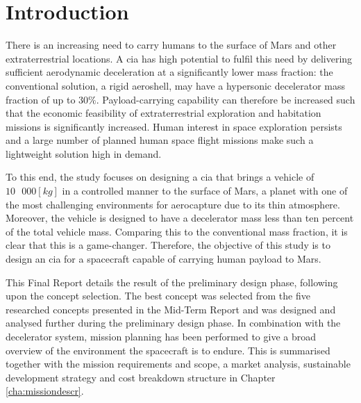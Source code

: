 \section{Introduction}
\label{cha:introduction}
There is an increasing need to carry humans to the surface of Mars and other extraterrestrial locations. A \gls{cia} has high potential to fulfil this need by delivering sufficient aerodynamic deceleration at a significantly lower mass fraction: the conventional solution, a rigid aeroshell, may have a hypersonic decelerator mass fraction of up to $30\%$. Payload-carrying capability can therefore be increased such that the economic feasibility of extraterrestrial exploration and habitation missions is significantly increased. Human interest in space exploration persists and a large number of planned human space flight missions make such a lightweight solution high in demand. 


To this end, the study focuses on designing a \gls{cia} that brings a vehicle of $10\mbox{ }000 \left[kg\right]$ in a controlled manner to the surface of Mars, a planet with one of the most challenging environments for aerocapture due to its thin atmosphere. Moreover, the vehicle is designed to have a decelerator mass less than ten percent of the total vehicle mass. Comparing this to the conventional mass fraction, it is clear that this is a game-changer. Therefore, the objective of this study is to design an \gls{cia} for a spacecraft capable of carrying human payload to Mars.

This Final Report details the result of the preliminary design phase, following upon the concept selection. The best concept was selected from the five researched concepts presented in the Mid-Term Report and was designed and analysed further during the preliminary design phase. In combination with the decelerator system, mission planning has been performed to give a broad overview of the environment the spacecraft is to endure. This is summarised together with the mission requirements and scope, a market analysis, sustainable development strategy and cost breakdown structure in Chapter \ref{cha:missiondescr}.

